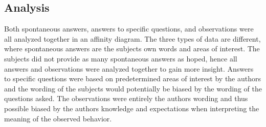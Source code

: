 \subsection{Analysis}
Both spontaneous answers, answers to specific questions, and observations were all analyzed together in an affinity diagram. The three types of data are different, where spontaneous answers are the subjects own words and areas of interest. The subjects did not provide as many spontaneous answers as hoped, hence all answers and observations were analyzed together to gain more insight. Answers to specific questions were based on predetermined areas of interest by the authors and the wording of the subjects would potentially be biased by the wording of the questions asked. The observations were entirely the authors wording and thus possible biased by the authors knowledge and expectations when interpreting the meaning of the observed behavior.